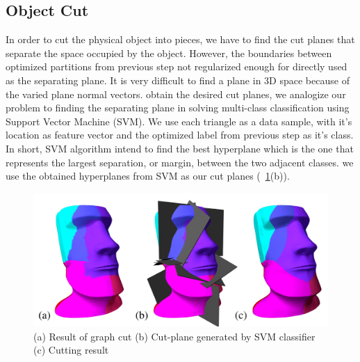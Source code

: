 \subsection{Object Cut}
In order to cut the physical object into pieces, we have to find the cut planes that separate the space occupied by the object.
However, the boundaries between optimized partitions from  previous step  not regularized enough for directly used as the separating plane. 
It is very difficult to find a plane in 3{D} space because of the varied plane normal vectors.
 obtain the desired cut planes, we analogize our problem to finding the separating plane in solving multi-class classification using Support Vector Machine (SVM).
We use each triangle as a data sample, with it's location as  feature vector and the optimized label from  previous step as it's class.
In short, SVM algorithm intend to find the best hyperplane which is the one that represents the largest separation, or margin, between the two adjacent classes. 
 we use the obtained hyperplanes from SVM as our cut planes (\figname~\ref{fig:cut_plane}(b)).


\begin{figure}[ht]
\centering
\includegraphics[width=1.0\linewidth]{figs/cut_plane1.pdf} 
\caption{(a) Result of graph cut (b) Cut-plane generated by SVM classifier (c) Cutting result} 
\label{fig:cut_plane}
\end{figure}

